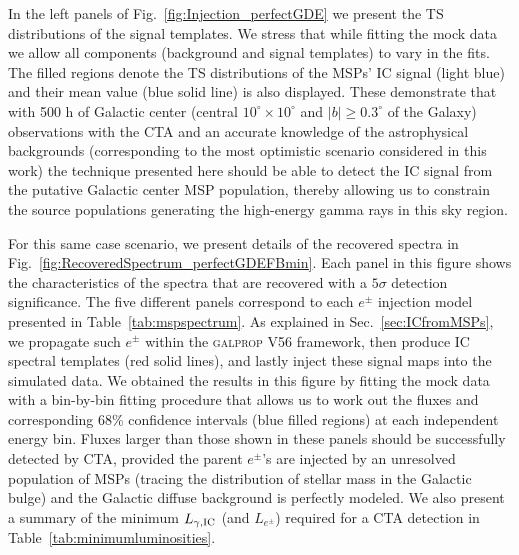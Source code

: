 \documentclass[doublespace,nopageskip]{VTthesis} %
\begin{document}
In the left panels of Fig.~\ref{fig:Injection_perfectGDE} we present the TS distributions of the signal templates. We stress that while fitting the mock data we allow all components (background and signal templates) to vary in the fits. The filled regions denote the TS distributions of the MSPs' IC signal (light blue) and their mean value (blue solid line) is also displayed. These demonstrate that with 500 h of Galactic center (central $10^\circ\times10^\circ$ and $|b|\geq0.3^\circ$ of the Galaxy)  observations 
with the CTA
and an accurate knowledge of the astrophysical backgrounds (corresponding to the most optimistic scenario considered in this work) the technique presented here should be able to detect the IC signal from the putative Galactic center MSP population, thereby allowing us to constrain the source populations generating the high-energy gamma rays in this sky region.

For this same case scenario, we present details of the recovered spectra in Fig.~\ref{fig:RecoveredSpectrum_perfectGDEFBmin}. Each panel in this figure shows the characteristics of the spectra that are recovered with a $5\sigma$ detection significance. The five different panels correspond to each $e^\pm$ injection model presented in Table~\ref{tab:mspspectrum}. As explained in Sec.~\ref{sec:ICfromMSPs}, we propagate such $e^\pm$ within the \textsc{galprop} V56 framework, then produce IC spectral templates (red solid lines), and lastly inject these signal maps into the simulated data. We obtained the results in this figure by fitting the mock data with a bin-by-bin fitting procedure that allows us to work out the fluxes and corresponding 68\% confidence intervals (blue filled regions) at each independent energy bin. Fluxes larger than those shown in these panels should be successfully detected by CTA, provided the parent $e^\pm$'s are injected by an unresolved population of MSPs (tracing the distribution of stellar mass in the Galactic bulge) and the Galactic diffuse background is perfectly modeled. We also present a summary of the minimum $L_{\gamma,{\rm IC}}$ (and $L_{e^\pm}$) 
required for a CTA detection in Table~\ref{tab:minimumluminosities}.
\end{document}
